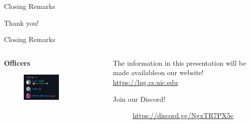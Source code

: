 \documentclass{beamer}
\begin{document}
\begin{frame}{Closing Remarks}
	\begin{center}
		\Huge Thank you!
	\end{center}
\end{frame}

\begin{frame}{Closing Remarks}
	\begin{columns}
		\begin{column}{0.5\textwidth}
			\textbf{Officers}
			\begin{figure}
				\centering
				\includegraphics[width=0.60\textwidth]{officers.png}
			\end{figure}
		\end{column}
		\begin{column}{0.5\textwidth}
			The information in this presentation will be made
			available\footnotemark on our website!\\
			\url{https://lug.cs.uic.edu}
			
			\bigskip
			Join our Discord!

			\begin{figure}
				\centering
				
				\caption{\url{https://discord.gg/NgxTR7PX5e}}
			\end{figure}
		\end{column}
	\end{columns}

\end{frame}
\end{document}
